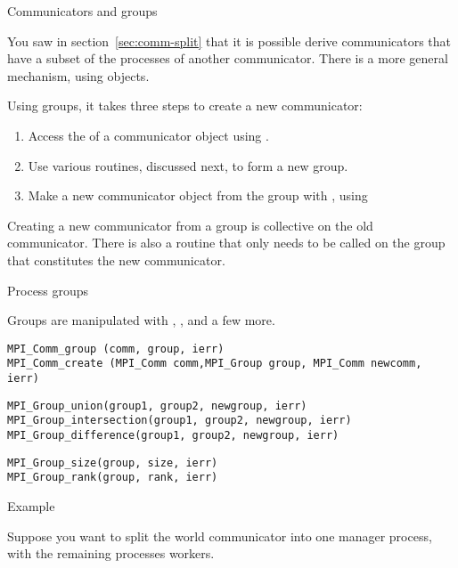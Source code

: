 
 {Communicators and groups}
\label{sec:mpi-comm-group}

You saw in section~\ref{sec:comm-split} that it is possible derive
communicators that have a subset of the processes of another communicator.
There is a more general mechanism, using 
objects.

Using groups, it takes three steps to create a new communicator:
\begin{enumerate}
\item Access the  of a communicator
  object using .
\item Use various routines, discussed next, to form a new group.
\item Make a new communicator object from the group with
  , using
\end{enumerate}

Creating a new communicator from a group is collective on the old communicator.
There is also a routine  that only
needs to be called on the group that constitutes the new communicator.

 {Process groups}
\label{sec:comm-group}

Groups are manipulated with
,
,
 and a few more.

\begin{lstlisting}
MPI_Comm_group (comm, group, ierr)
MPI_Comm_create (MPI_Comm comm,MPI_Group group, MPI_Comm newcomm, ierr)
\end{lstlisting}

\begin{lstlisting}
MPI_Group_union(group1, group2, newgroup, ierr)
MPI_Group_intersection(group1, group2, newgroup, ierr)
MPI_Group_difference(group1, group2, newgroup, ierr)
\end{lstlisting}

\begin{lstlisting}
MPI_Group_size(group, size, ierr)
MPI_Group_rank(group, rank, ierr)
\end{lstlisting}

 {Example}

Suppose you want to split the world communicator into
one manager process, with the remaining processes workers.
%
